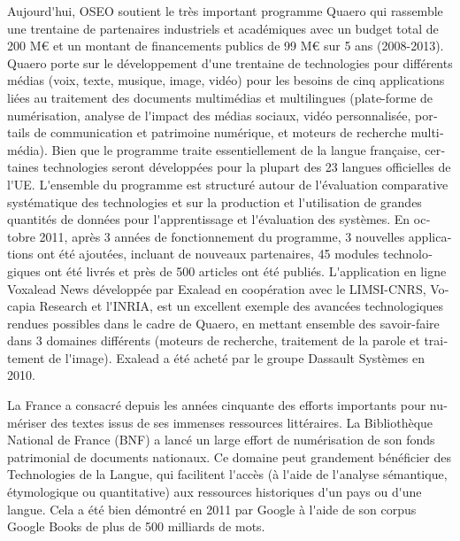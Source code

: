 \begin{french}
\begin{multicols}{2}
Aujourd{\mbox '}hui, OSEO soutient le très important programme Quaero qui
rassemble une trentaine de partenaires industriels et académiques avec
un budget total de 200 M€ et un montant de financements publics de 99
M€ sur 5 ans (2008-2013). Quaero porte sur le développement d{\mbox '}une
trentaine de technologies pour différents médias (voix, texte,
musique, image, vidéo) pour les besoins de cinq applications liées au
traitement des documents multimédias et multilingues (plate-forme de
numérisation, analyse de l{\mbox '}impact des médias sociaux, vidéo
personnalisée, portails de communication et patrimoine numérique, et
moteurs de recherche multimédia). Bien que le programme traite
essentiellement de la langue française, certaines technologies seront
développées pour la plupart des 23 langues officielles de
l{\mbox '}UE. L{\mbox '}ensemble du programme est structuré autour de l{\mbox '}évaluation
comparative systématique des technologies et sur la production et
l{\mbox '}utilisation de grandes quantités de données pour l{\mbox '}apprentissage et
l{\mbox '}évaluation des systèmes. En octobre 2011, après 3 années de
fonctionnement du programme, 3 nouvelles applications ont été
ajoutées, incluant de nouveaux partenaires, 45 modules technologiques
ont été livrés et près de 500 articles ont été publiés. L{\mbox '}application
en ligne Voxalead News développée par Exalead en coopération avec le
LIMSI-CNRS, Vocapia Research et l{\mbox '}INRIA, est un excellent exemple des
avancées technologiques rendues possibles dans le cadre de Quaero, en
mettant ensemble des savoir-faire dans 3 domaines différents (moteurs
de recherche, traitement de la parole et traitement de
l{\mbox '}image). Exalead a été acheté par le groupe Dassault Systèmes en 2010.

La France a consacré depuis les années cinquante des efforts
importants pour numériser des textes issus de ses immenses ressources
littéraires. La Bibliothèque National de France (BNF) a lancé un large
effort de numérisation de son fonds patrimonial de documents
nationaux. Ce domaine peut grandement bénéficier des Technologies de
la Langue, qui facilitent l{\mbox '}accès (à l{\mbox '}aide de l{\mbox '}analyse sémantique,
étymologique ou quantitative) aux ressources historiques d{\mbox '}un pays ou
d{\mbox '}une langue. Cela a été bien démontré en 2011 par Google à l{\mbox '}aide de
son corpus Google Books de plus de 500 milliards de mots.


\end{multicols}
\end{french}
